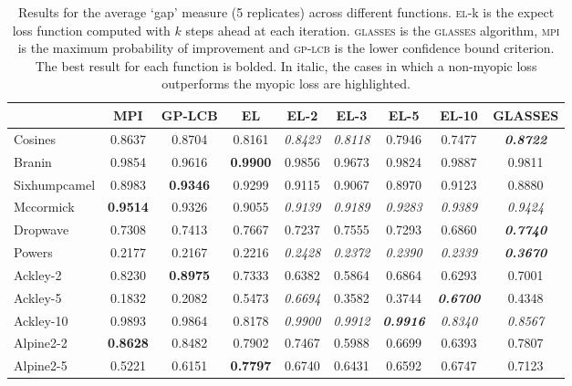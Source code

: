 \documentclass[twoside]{article}
\newcommand{\acr}[1]{\textsc{#1}\xspace}
\newcommand{\us}{\acr{glasses}}
\newcommand{\mpi}{\acr{mpi}}
\newcommand{\el}{\acr{el}}
\newcommand{\lcb}{\acr{gp-lcb}}
\begin{document}
\begin{table}[t!]
\begin{center}
\begin{tabular}{l|ccc|cccc|c}
\toprule
{} &     MPI &     GP-LCB &      EL &    EL-2 &    EL-3 &    EL-5 &  EL-10 &    GLASSES \\
\midrule
Cosines           &  0.8637 &  0.8704 &  0.8161 &  \emph{0.8423} &  \emph{0.8118} &  0.7946 &  0.7477 &  \emph{\textbf{0.8722}} \\
Branin              &  0.9854 &  0.9616 &  \textbf{0.9900} &  0.9856 &  0.9673 &  0.9824 &  0.9887 &  0.9811 \\
Sixhumpcamel        &  0.8983 &  \textbf{0.9346} &  0.9299 &  0.9115 &  0.9067 &  0.8970 &  0.9123 &  0.8880 \\
Mccormick           & \textbf{0.9514} &  0.9326 &  0.9055 &  \emph{0.9139} &  \emph{0.9189} &  \emph{0.9283} &  \emph{0.9389} &  \emph{0.9424} \\
Dropwave            &  0.7308 &  0.7413 &  0.7667 &  0.7237 &  0.7555 &  0.7293 &  0.6860 &  \emph{\textbf{0.7740}} \\
Powers              &  0.2177 &  0.2167 &  0.2216 &  \emph{0.2428} &  \emph{0.2372} &  \emph{0.2390} &  \emph{0.2339} &  \emph{\textbf{0.3670}} \\
Ackley-2 &  0.8230 &  \textbf{0.8975} &  0.7333 &  0.6382 &  0.5864 &  0.6864 &  0.6293 &  0.7001 \\
Ackley-5  & 0.1832&   0.2082&   0.5473&   \emph{0.6694}&  0.3582&   0.3744&   \emph{\textbf{0.6700}} &  0.4348\\ 
Ackley-10 &  0.9893 &  0.9864 &  0.8178 &   \emph{0.9900} &   \emph{0.9912} &   \emph{\textbf{0.9916}} &   \emph{0.8340} &   \emph{0.8567} \\
Alpine2-2 &  \textbf{0.8628} &  0.8482 &  0.7902 &  0.7467 &  0.5988 &  0.6699 &  0.6393 &  0.7807 \\
Alpine2-5  &  0.5221 &  0.6151 &  \textbf{0.7797} &  0.6740 &  0.6431 &  0.6592 &  0.6747 &  0.7123 \\
\bottomrule
\end{tabular}\caption{Results for the average `gap' measure (5 replicates) across different functions.  \el-k is the expect loss function computed with $k$ steps ahead at each iteration. \us is the \us algorithm, \mpi is the maximum probability of improvement and \lcb is the lower confidence bound criterion. The best result for each function is bolded. In italic, the cases in which a non-myopic loss outperforms the myopic  loss are highlighted.}\label{table:comparision}
\end{center}
\end{table}
\end{document}
